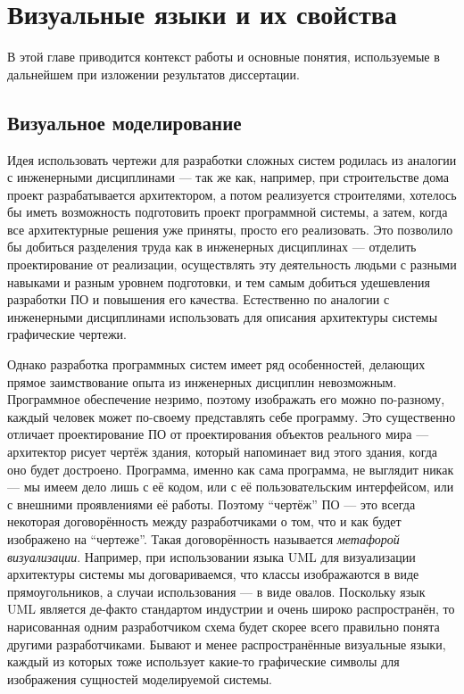 \chapter{Визуальные языки и их свойства}
\label{chapter1}

В этой главе приводится контекст работы и основные понятия, используемые в 
дальнейшем при изложении результатов диссертации. 

\section{Визуальное моделирование}
Идея использовать чертежи для разработки сложных систем родилась из аналогии с 
инженерными дисциплинами --- так же как, например, при строительстве дома проект 
разрабатывается архитектором, а потом реализуется строителями, хотелось бы иметь 
возможность подготовить проект программной системы, а затем, когда все 
архитектурные решения уже приняты, просто его реализовать. Это позволило бы 
добиться разделения труда как в инженерных дисциплинах --- отделить 
проектирование от реализации, осуществлять эту деятельность людьми с разными 
навыками и разным уровнем подготовки, и тем самым добиться удешевления разработки 
ПО и повышения его качества. Естественно по аналогии с инженерными дисциплинами 
использовать для описания архитектуры системы графические чертежи.

Однако разработка программных систем имеет ряд особенностей, делающих прямое 
заимствование опыта из инженерных дисциплин невозможным. Программное обеспечение 
незримо, поэтому изображать его можно по-разному, каждый человек может по-своему 
представлять себе программу. Это существенно отличает проектирование ПО от 
проектирования объектов реального мира --- архитектор рисует чертёж здания, 
который напоминает вид этого здания, когда оно будет достроено. Программа, 
именно как сама программа, не выглядит никак --- мы имеем дело лишь с её кодом, 
или с её пользовательским интерфейсом, или с внешними проявлениями её работы. 
Поэтому "`чертёж"' ПО --- это всегда некоторая договорённость между 
разработчиками о том, что и как будет изображено на "`чертеже"'. Такая договорённость называется 
\textit{метафорой визуализации}. Например, при использовании 
языка UML для визуализации архитектуры системы мы договариваемся, что классы 
изображаются в виде прямоугольников, а случаи использования --- в виде овалов. 
Поскольку язык UML является де-факто стандартом индустрии и очень широко 
распространён, то нарисованная одним разработчиком схема будет скорее всего 
правильно понята другими разработчиками. Бывают и менее распространённые 
визуальные языки, каждый из которых тоже использует какие-то графические символы 
для изображения сущностей моделируемой системы.

